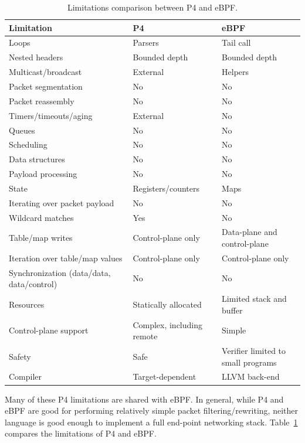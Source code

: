 \begin{table}[h]
  \footnotesize
  \begin{center}
  \begin{tabular}{|p{5cm}|l|l|} \hline
    \textbf{Limitation} & \textbf{P4} & \textbf{eBPF} \\ \hline \hline
    Loops & Parsers & Tail call \\ \hline
    Nested headers & Bounded depth & Bounded depth \\ \hline
    Multicast/broadcast & External & Helpers \\ \hline
    Packet segmentation & No & No \\ \hline
    Packet reassembly &	No & No \\ \hline
    Timers/timeouts/aging & External & No \\ \hline
    Queues & No & No \\ \hline
    Scheduling & No & No \\ \hline
    Data structures & No & No \\ \hline
    Payload processing & No & No \\ \hline
    State & Registers/counters & Maps \\ \hline
    Iterating over packet payload & No & No \\ \hline
    Wildcard matches & Yes & No \\ \hline
    Table/map writes & Control-plane only & Data-plane and control-plane \\ \hline
    Iteration over table/map values & Control-plane only & Control-plane only \\ \hline
    Synchronization (data/data, data/control)  & No & No \\
    Resources & Statically allocated & Limited stack and buffer \\ \hline
    Control-plane support & Complex, including remote & Simple \\ \hline
    Safety & Safe & Verifier limited to small programs \\ \hline
    Compiler & Target-dependent & LLVM back-end \\ \hline
  \end{tabular}
  \caption{Limitations comparison between P4 and eBPF.}\label{table:limitations}
  \end{center}
\end{table}

Many of these P4 limitations are shared with eBPF.  In general, while
P4 and eBPF are good for performing relatively simple packet
filtering/rewriting, neither language is good enough to implement a
full end-point networking stack.  Table~\ref{table:limitations}
compares the limitations of P4 and eBPF.
